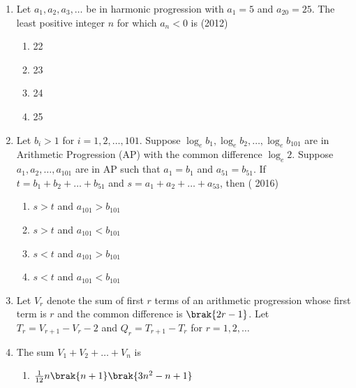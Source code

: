 \begin{enumerate}    [label=\thesubsection.\arabic*, ref=\thesubsection.\theenumi]
\begin{multicols}{4}
         \end{multicols}
%  
\item Let ${a_1, a_2, a_3, \dots}$ be in harmonic progression with ${a_1}=5$ and ${a_{20}}=25$. The least positive integer $n$ for which ${a_n<0}$ is \hfill(2012)
                \begin{multicols}{4}
\begin{enumerate}    
                    \item 22
                    \item 23
                    \item 24
                    \item 25
                    \end{enumerate}
                    \end{multicols}
\item Let ${b_i}>1$ for $i=1, 2, \dots, 101$. Suppose ${\log_e}{b_1}, {\log_e}{b_2}, \dots, {\log_e}{b_{101}}$ are in Arithmetic Progression (AP) with the common difference ${\log_e}2$. Suppose ${a_1, a_2, \dots, a_{101}}$ are in AP such that ${a_1=b_1}$ and ${a_{51}=b_{51}}$. If $t={b_1+b_2+\dots+b_{51}}$ and $s={a_1+a_2+\dots+a_{53}}$,  then \hfill ( 2016)
                    \begin{multicols}{2}
\begin{enumerate}    
%                    
                        \item $s>t$ and ${a_{101}>b_{101}}$
                        \item $s>t$ and ${a_{101}<b_{101}}$
                        \item $s<t$ and ${a_{101}>b_{101}}$
                        \item $s<t$ and ${a_{101}<b_{101}}$
                        \end{enumerate}
                        \end{multicols}
%    
\item[]
 Let $ V_{r} $ denote the sum of first $r$ terms of an arithmetic progression  whose first term is $r$ and the common difference is $\brak{2r-1}$. Let $ T_{r}=V_{r+1}-V_{r}-2 $ and $ Q_{r}=T_{r+1}-T_{r}$ for $r=1, 2, \dots$
% 
%
 \item The sum  $  V_{1}+V_{2}+\dots+V_{n} $  is 
% 
	 \hfill {}                            
     \begin{multicols}{2}
\begin{enumerate}    
%         
	     \item $\frac{1}{12}n\brak{n+1}\brak{3n^{2}-n+1}$

\end{enumerate}
\end{multicols}
\end{enumerate}
